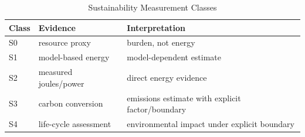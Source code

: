 \begin{table}[H]\centering\caption{Sustainability Measurement Classes}\label{tab:sustainability}\scriptsize\begin{tabularx}{\columnwidth}{p{}p{}Y}\toprule Class & Evidence & Interpretation\\\midrule S0 & resource proxy & burden, not energy\\ S1 & model-based energy & model-dependent estimate\\ S2 & measured joules/power & direct energy evidence\\ S3 & carbon conversion & emissions estimate with explicit factor/boundary\\ S4 & life-cycle assessment & environmental impact under explicit boundary\\\bottomrule\end{tabularx}\end{table}